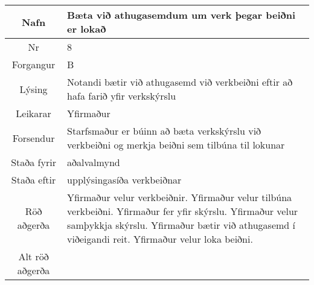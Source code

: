 \documentclass[a4paper]{article}
\begin{document}
\begin{tabular}{|c|p{10cm}|}
\hline
Nafn&Bæta við athugasemdum um verk þegar beiðni er lokað\\
\hline
Nr&8\\
\hline
Forgangur&B\\
\hline
Lýsing&Notandi bætir við athugasemd við verkbeiðni eftir að hafa farið yfir verkskýrslu\\
\hline
Leikarar&Yfirmaður\\
\hline
Forsendur&Starfsmaður er búinn að bæta verkskýrslu við verkbeiðni og merkja beiðni sem tilbúna til lokunar\\
\hline
Staða fyrir&aðalvalmynd\\
\hline
Staða eftir&upplýsingasíða verkbeiðnar\\
\hline
Röð aðgerða&Yfirmaður velur verkbeiðnir. Yfirmaður velur tilbúna verkbeiðni. Yfirmaður fer yfir skýrslu. Yfirmaður velur samþykkja skýrslu. Yfirmaður bætir við athugasemd í viðeigandi reit. Yfirmaður velur loka beiðni.\\
\hline
Alt röð aðgerða&\\
\hline
\end{tabular}
\end{document}

